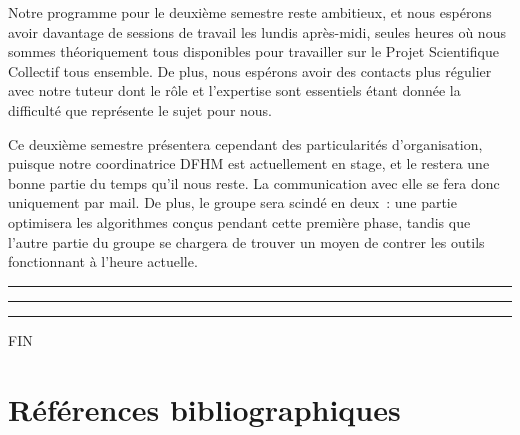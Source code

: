 \documentclass[a4paper, 12pt,twoside]{article}
\begin{document}
        Notre programme pour le deuxième semestre reste ambitieux, et nous espérons avoir davantage de sessions de travail les lundis après-midi, seules heures où nous sommes théoriquement tous disponibles pour travailler sur le Projet Scientifique Collectif tous ensemble. De plus, nous espérons avoir des contacts plus régulier avec notre tuteur dont le rôle et l'expertise sont essentiels étant donnée la difficulté que représente le sujet pour nous.

        Ce deuxième semestre présentera cependant des particularités d'organisation, puisque notre coordinatrice DFHM est actuellement en stage, et le restera une bonne partie du temps qu'il nous reste. La communication avec elle se fera donc uniquement par mail. De plus, le groupe sera scindé en deux~: une partie optimisera les algorithmes conçus pendant cette première phase, tandis que l'autre partie du groupe se chargera de trouver un moyen de contrer les outils fonctionnant à l'heure actuelle.

    \begin{center}
        \color{bleu303}

        \rule{0.3\textwidth}{0.2mm}\vspace*{-3.5mm}

        \rule{0.5\textwidth}{0.6mm}\vspace*{-3.8mm}

        \rule{0.3\textwidth}{0.2mm}\vspace*{-1mm}

        \sffamily FIN
    \end{center}
    
     \clearpage
        \section{Références bibliographiques}
        {
        \renewcommand{\section}[2]{} %
        \nocite{*}
        
        
        }

    
\end{document}
